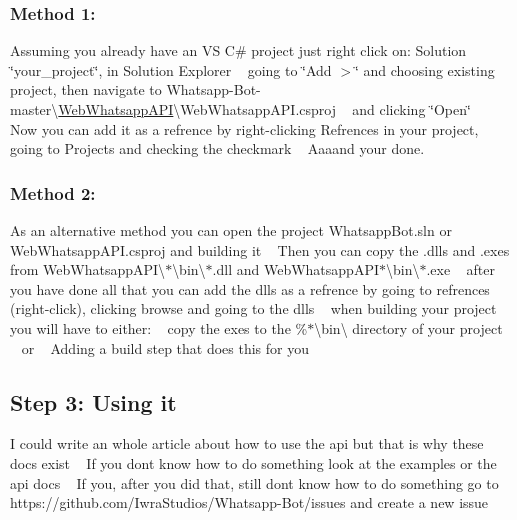 \subsubsection*{Method 1\+:}

Assuming you already have an VS C\# project just right click on\+: Solution \char`\"{}your\+\_\+project\char`\"{}, in Solution Explorer ~\newline
 going to \char`\"{}\+Add $>$\char`\"{} and choosing existing project, then navigate to Whatsapp-\/\+Bot-\/master\textbackslash{}\hyperlink{namespace_web_whatsapp_a_p_i}{Web\+Whatsapp\+A\+PI}\textbackslash{}Web\+Whatsapp\+A\+P\+I.\+csproj ~\newline
 and clicking \char`\"{}\+Open\char`\"{} ~\newline
 Now you can add it as a refrence by right-\/clicking Refrences in your project, going to Projects and checking the checkmark ~\newline
 Aaaand your done. ~\newline
 \subsubsection*{Method 2\+:}

As an alternative method you can open the project Whatsapp\+Bot.\+sln or Web\+Whatsapp\+A\+P\+I.\+csproj and building it ~\newline
 Then you can copy the .dll\textquotesingle{}s and .exe\textquotesingle{}s from Web\+Whatsapp\+A\+PI\textbackslash{}$\ast$\textbackslash{}bin\textbackslash{}$\ast$.dll and Web\+Whatsapp\+A\+P\+I$\ast$\textbackslash{}bin\textbackslash{}$\ast$.exe ~\newline
 after you have done all that you can add the dll\textquotesingle{}s as a refrence by going to refrences (right-\/click), clicking browse and going to the dll\textquotesingle{}s ~\newline
 when building your project you will have to either\+: ~\newline
 copy the exe\textquotesingle{}s to the \%$\ast$\textbackslash{}bin\textbackslash{} directory of your project ~\newline
 or ~\newline
 Adding a build step that does this for you ~\newline
 \hypertarget{index_step3}{}\subsection{Step 3\+: Using it}\label{index_step3}
I could write an whole article about how to use the api but that is why these docs exist ~\newline
 If you don\textquotesingle{}t know how to do something look at the examples or the api docs ~\newline
 If you, after you did that, still don\textquotesingle{}t know how to do something go to https\+://github.com/\+Iwra\+Studios/\+Whatsapp-\/\+Bot/issues and create a new issue ~\newline
